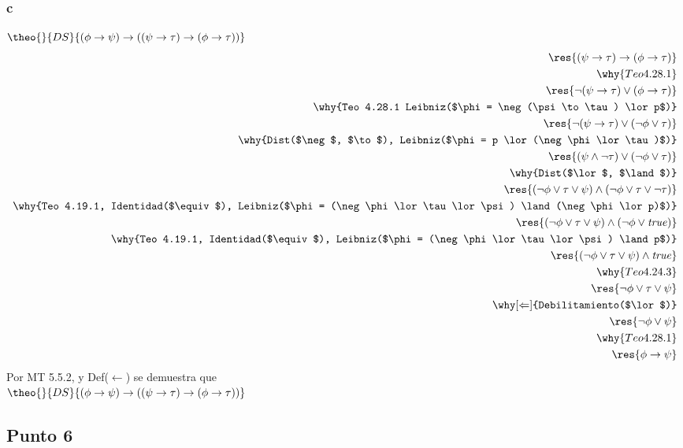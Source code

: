 \documentclass{article}
\begin{document}
\subsubsection{c}
\begin{logicenv}{$\theo{}{DS}{(\phi \to \psi) \to ((\psi \to \tau) \to (\phi \to \tau))}$}
    \begin{align*}
            \res{(\psi \to \tau) \to (\phi \to \tau)}\\
        \why{Teo 4.28.1}\\
            \res{\neg(\psi \to \tau) \lor (\phi \to \tau)}\\
        \why{Teo 4.28.1 Leibniz($\phi = \neg(\psi \to \tau) \lor p$)}\\
            \res{\neg(\psi \to \tau) \lor (\neg\phi \lor \tau)}\\
        \why{Dist($\neg$, $\to$), Leibniz($\phi = p \lor (\neg\phi \lor \tau)$)}\\
            \res{(\psi \land \neg\tau) \lor (\neg\phi \lor \tau)}\\
        \why{Dist($\lor$, $\land$)}\\
            \res{(\neg\phi \lor \tau \lor \psi) \land (\neg\phi \lor \tau \lor \neg\tau)}\\
        \why{Teo 4.19.1, Identidad($\equiv$), Leibniz($\phi = (\neg\phi \lor \tau \lor \psi) \land (\neg\phi \lor p)$)}\\
            \res{(\neg\phi \lor \tau \lor \psi) \land (\neg\phi \lor \text{\textit{true}})}\\
        \why{Teo 4.19.1, Identidad($\equiv$), Leibniz($\phi = (\neg\phi \lor \tau \lor \psi) \land p$)}\\
            \res{(\neg\phi \lor \tau \lor \psi) \land \text{\textit{true}}}\\
        \why{Teo 4.24.3}\\
            \res{\neg\phi \lor \tau \lor \psi}\\
        \why[\Leftarrow]{Debilitamiento($\lor$)}\\
            \res{\neg\phi \lor \psi}\\
        \why{Teo 4.28.1}\\
            \res{\phi \to \psi}
    \end{align*}
    Por MT 5.5.2, y Def($\gets$) se demuestra que\\
    $\theo{}{DS}{(\phi \to \psi) \to ((\psi \to \tau) \to (\phi \to \tau))}$
\end{logicenv}


\subsection{Punto 6}
\end{document}
